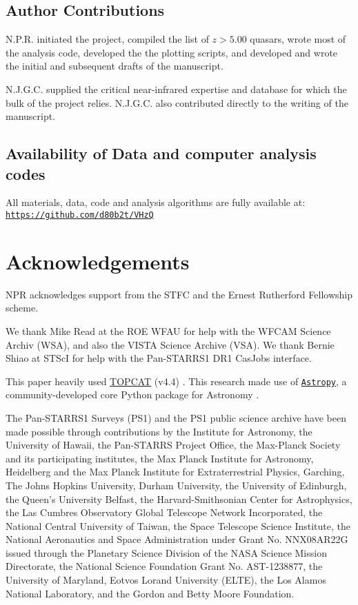 \documentclass[usenatbib]{mnras}
\begin{document}
\subsection*{Author Contributions}   
N.P.R. initiated the project, compiled the list of $z>5.00$ quasars, wrote most of the analysis code, developed the the plotting scripts, and developed and wrote the initial and subsequent drafts of the manuscript.

N.J.G.C. supplied the critical near-infrared expertise and database for which the bulk of the project relies. N.J.G.C. also contributed directly to the writing of the manuscript.


\subsection*{Availability of Data and computer analysis codes} 
All materials, data, code and analysis algorithms are fully 
available at: 
\href{https://github.com/d80b2t/VHzQ}{\tt https://github.com/d80b2t/VHzQ}


\section*{Acknowledgements}
NPR acknowledges support from the STFC and the Ernest Rutherford Fellowship scheme. 

We thank Mike Read at the ROE WFAU for help with the WFCAM Science Archiv (WSA), and 
also the VISTA Science Archive (VSA). We thank Bernie Shiao at STScI for help with the Pan-STARRS1 DR1 CasJobs interface. 

This paper heavily used \href{http://www.star.bris.ac.uk/~mbt/topcat/}{TOPCAT} (v4.4)
\citep[][]{Taylor2005, Taylor2011}.
This research made use of \href{http://www.astropy.org}{\tt Astropy}, 
a community-developed core Python package for Astronomy 
\citep{AstropyCollaboration2013, AstropyCollaboration2018}. 

The Pan-STARRS1 Surveys (PS1) and the PS1 public science archive have
been made possible through contributions by the Institute for
Astronomy, the University of Hawaii, the Pan-STARRS Project Office,
the Max-Planck Society and its participating institutes, the Max
Planck Institute for Astronomy, Heidelberg and the Max Planck
Institute for Extraterrestrial Physics, Garching, The Johns Hopkins
University, Durham University, the University of Edinburgh, the
Queen's University Belfast, the Harvard-Smithsonian Center for
Astrophysics, the Las Cumbres Observatory Global Telescope Network
Incorporated, the National Central University of Taiwan, the Space
Telescope Science Institute, the National Aeronautics and Space
Administration under Grant No. NNX08AR22G issued through the Planetary
Science Division of the NASA Science Mission Directorate, the National
Science Foundation Grant No. AST-1238877, the University of Maryland,
Eotvos Lorand University (ELTE), the Los Alamos National Laboratory,
and the Gordon and Betty Moore Foundation.
\end{document}
